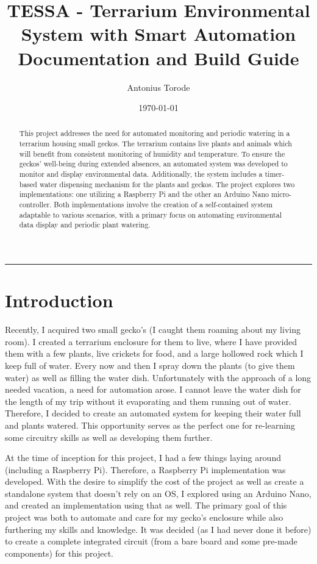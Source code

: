 \documentclass{article}
\title{TESSA - Terrarium Environmental System with Smart Automation\\
	Documentation and Build Guide}
\author{Antonius Torode}
\date{\today}
\begin{document}
	
	\maketitle
	
	\tableofcontents
	
	
	\begin{abstract}
		This project addresses the need for automated monitoring and periodic watering in a terrarium housing small geckos. The terrarium contains live plants and animals which will benefit from consistent monitoring of humidity and temperature. To ensure the geckos' well-being during extended absences, an automated system was developed to monitor and display environmental data. Additionally, the system includes a timer-based water dispensing mechanism for the plants and geckos. The project explores two implementations: one utilizing a Raspberry Pi and the other an Arduino Nano micro-controller. Both implementations involve the creation of a self-contained system adaptable to various scenarios, with a primary focus on automating environmental data display and periodic plant watering.
	\end{abstract}
	
		\hrule
		
		\section{Introduction}
		Recently, I acquired two small gecko's (I caught them roaming about my living room). I created a terrarium enclosure for them to live, where I have provided them with a few plants, live crickets for food, and a large hollowed rock which I keep full of water. Every now and then I spray down the plants (to give them water) as well as filling the water dish. Unfortunately with the approach of a long needed vacation, a need for automation arose. I cannot leave the water dish for the length of my trip without it evaporating and them running out of water. Therefore, I decided to create an automated system for keeping their water full and plants watered. This opportunity serves as the perfect one for re-learning some circuitry skills as well as developing them further.
		
		At the time of inception for this project, I had a few things laying around (including a Raspberry Pi). Therefore, a Raspberry Pi implementation was developed. With the desire to simplify the cost of the project as well as create a standalone system that doesn't rely on an OS, I explored using an Arduino Nano, and created an implementation using that as well. The primary goal of this project was both to automate and care for my gecko's enclosure while also furthering my skills and knowledge. It was decided (as I had never done it before) to create a complete integrated circuit (from a bare board and some pre-made components) for this project.
		
\end{document}
